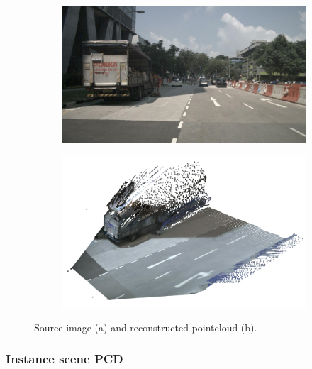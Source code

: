 \begin{figure}[h!]
    \centering
    \begin{subfigure}[b]{0.45\textwidth}
        \includegraphics[width=\textwidth]{images/methodology/raw_image_0.jpg}
        \caption{}
        \label{fig:raw_pointcloud_a}
    \end{subfigure}
    \hfill
    \begin{subfigure}[b]{0.45\textwidth}
        \includegraphics[width=\textwidth]{images/methodology/pcd_raw.png}
        \caption{}
        \label{fig:raw_pointcloud_b}
    \end{subfigure}

    \caption{Source image (a) and reconstructed pointcloud (b).}
    \label{fig:raw_pointcloud}
\end{figure}

\subsubsection{Instance scene PCD}


